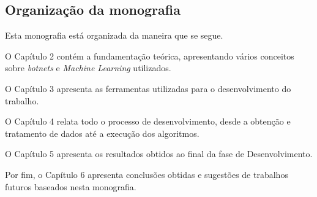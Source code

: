 \subsection{Organização da monografia}

Esta monografia está organizada da maneira que se segue.

O Capítulo 2 contém a fundamentação teórica, apresentando vários conceitos sobre \textit{botnets} e \textit{Machine Learning} utilizados.

O Capítulo 3 apresenta as ferramentas utilizadas para o desenvolvimento do trabalho.

O Capítulo 4 relata todo o processo de desenvolvimento, desde a obtenção e tratamento de dados até a execução dos algoritmos.

O Capítulo 5 apresenta os resultados obtidos ao final da fase de Desenvolvimento.

Por fim, o Capítulo 6 apresenta conclusões obtidas e sugestões de trabalhos futuros baseados nesta monografia.
